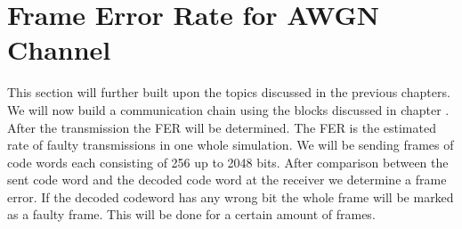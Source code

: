 \chapter{Frame Error Rate for AWGN Channel}
 \label{chap:AWGNchain}
\graphicspath{{C:/Users/Kevin/Bachelarbeit/Bachelorarbeit/01_Bachelorarbeit_LaTex/02_Figures/}}

This section will further built upon the topics discussed in the previous chapters. We will now build a communication chain using the blocks discussed in chapter . After the transmission the \gls{FER} will be determined. The \gls{FER} is the estimated rate of faulty transmissions in one whole simulation. We will be sending frames of code words each consisting of 256 up to 2048 bits. After comparison between the sent code word and the decoded code word at the receiver we determine a frame error. If the decoded codeword has any wrong bit the whole frame will be marked as a faulty frame. This will be done for a certain amount of frames.


